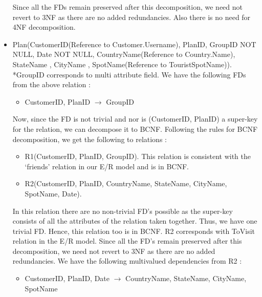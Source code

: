 \documentclass[a4paper,11pt]{article}
\begin{document}
\begin{itemize}
Since  all the FDs remain preserved after this decomposition, we need not revert to 3NF as there are no added redundancies. Also there is no need for 4NF decomposition.

\item Plan(CustomerID(Reference to Customer.Username), PlanID, GroupID NOT NULL, Date NOT NULL,  CountryName(Reference to Country.Name), StateName , CityName , SpotName(Reference to TouristSpotName)). \newline
*GroupID corresponds to multi attribute field.\newline \newline
We have the following FDs from the above relation :
\begin{itemize}
\item CustomerID, PlanID $\rightarrow$ GroupID
\end{itemize}

Now, since the FD is not trivial and nor is (CustomerID, PlanID) a super-key for the relation, we can decompose it to BCNF. Following the rules for BCNF decomposition, we get the following to relations :
\begin{itemize}
\item R1(CustomerID, PlanID, GroupID).
This relation is consistent with the ‘friends’ relation in our E/R model and is in BCNF.
\item R2(CustomerID, PlanID, CountryName, StateName, CityName, SpotName, Date).
\end{itemize}

In this relation there are no non-trivial FD’s possible as the super-key consists of all the attributes of the relation taken together. Thus, we have one trivial FD. Hence, this relation too is in BCNF. R2 corresponds with ToVisit relation in the E/R model. \newline
Since  all the FD’s remain preserved after this decomposition, we need not revert to 3NF as there are no added redundancies. \newline
We have the following multivalued dependencies from R2 :
\begin{itemize}
\item CustomerID, PlanID, Date $\rightarrow$ CountryName, StateName, CityName, SpotName
\end{itemize}


\end{itemize}
\end{document}
